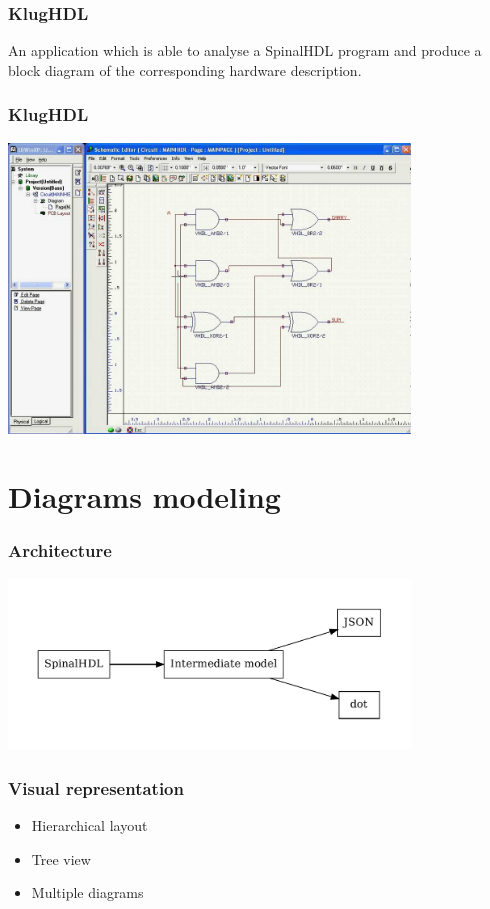 \documentclass[11pt, handout]{beamer}
\begin{document}
\begin{frame}
  \frametitle{KlugHDL}
  \begin{tcolorbox}
  An application which is able to analyse a SpinalHDL program and produce a
  block diagram of the corresponding hardware description.
  \end{tcolorbox}
\end{frame}

\begin{frame}
  \frametitle{KlugHDL}
  \begin{center}
  \includegraphics[width=0.8\textwidth]{vhdl_diagram_example}
  \end{center}
\end{frame}

\section{Diagrams modeling}

\begin{frame}
  \frametitle{Architecture}
  \begin{center}
    \includegraphics[width=0.8\textwidth]{architecture}
  \end{center}
\end{frame}

\begin{frame}
  \frametitle{Visual representation}
  \begin{itemize}
  \item Hierarchical layout
  \item Tree view
  \item Multiple diagrams
  \end{itemize}
\end{frame}
\end{document}
